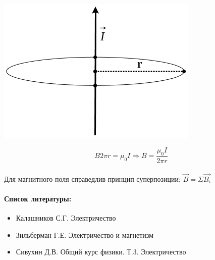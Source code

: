\documentclass[dvipdfmx]{article}
\begin{document}
\paragraph{}
\begin{minipage}{0.4\linewidth}
  \includegraphics[width=\linewidth,natwidth=364,natheight=266]{images/4.png}
\end{minipage}
\begin{minipage}{0.5\linewidth}
  \begin{equation*}
    B2\pi r = \mu_0I \Rightarrow B = \frac{\mu_0I}{2\pi r}
  \end{equation*}
\end{minipage}

\paragraph{}

Для магнитного поля справедлив принцип суперпозиции: $\vec{B} = \Sigma\vec{B_i}$

\paragraph{Список литературы:}

\begin{itemize}
\item
  Калашников С.Г. Электричество
\item
  Зильберман Г.Е. Электричество и магнетизм
\item
  Сивухин Д.В. Общий курс физики. Т.3. Электричество
\end{itemize}
\end{document}
